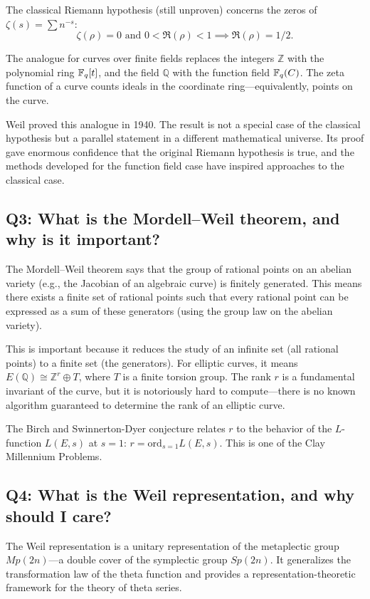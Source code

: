 The classical Riemann hypothesis (still unproven) concerns the zeros of $\zeta(s) = \sum n^{-s}$:
\[
\zeta(\rho) = 0 \text{ and } 0 < \Re(\rho) < 1 \implies \Re(\rho) = 1/2.
\]

The analogue for curves over finite fields replaces the integers $\mathbb{Z}$ with the polynomial ring $\mathbb{F}_q[t]$, and the field $\mathbb{Q}$ with the function field $\mathbb{F}_q(C)$. The zeta function of a curve counts ideals in the coordinate ring---equivalently, points on the curve.

Weil proved this analogue in 1940. The result is not a special case of the classical hypothesis but a parallel statement in a different mathematical universe. Its proof gave enormous confidence that the original Riemann hypothesis is true, and the methods developed for the function field case have inspired approaches to the classical case.

\subsection*{Q3: What is the Mordell--Weil theorem, and why is it important?}

The Mordell--Weil theorem says that the group of rational points on an abelian variety (e.g., the Jacobian of an algebraic curve) is finitely generated. This means there exists a finite set of rational points such that every rational point can be expressed as a sum of these generators (using the group law on the abelian variety).

This is important because it reduces the study of an infinite set (all rational points) to a finite set (the generators). For elliptic curves, it means $E(\mathbb{Q}) \cong \mathbb{Z}^r \oplus T$, where $T$ is a finite torsion group. The rank $r$ is a fundamental invariant of the curve, but it is notoriously hard to compute---there is no known algorithm guaranteed to determine the rank of an elliptic curve.

The Birch and Swinnerton-Dyer conjecture relates $r$ to the behavior of the $L$-function $L(E,s)$ at $s=1$: $r = \text{ord}_{s=1} L(E,s)$. This is one of the Clay Millennium Problems.

\subsection*{Q4: What is the Weil representation, and why should I care?}

The Weil representation is a unitary representation of the metaplectic group $Mp(2n)$---a double cover of the symplectic group $Sp(2n)$. It generalizes the transformation law of the theta function and provides a representation-theoretic framework for the theory of theta series.

